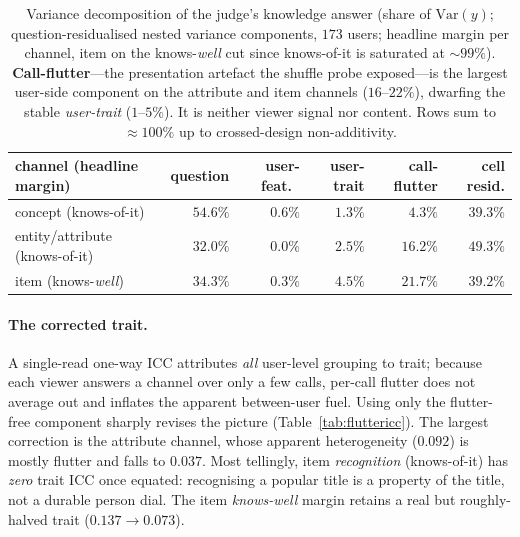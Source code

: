\documentclass[11pt]{article}
\begin{document}
\begin{table}[h]\centering\small
\begin{tabular}{lrrrrr}
\toprule
channel (headline margin) & question & user-feat.\ & user-trait & call-flutter & cell resid.\\
\midrule
concept (knows-of-it)          & $54.6\%$ & $0.6\%$ & $1.3\%$ & $4.3\%$  & $39.3\%$\\
entity/attribute (knows-of-it) & $32.0\%$ & $0.0\%$ & $2.5\%$ & $16.2\%$ & $49.3\%$\\
item (knows-\emph{well})       & $34.3\%$ & $0.3\%$ & $4.5\%$ & $21.7\%$ & $39.2\%$\\
\bottomrule
\end{tabular}
\caption{Variance decomposition of the judge's knowledge answer (share of $\mathrm{Var}(y)$; question-residualised
nested variance components, $173$ users; headline margin per channel, item on the knows-\emph{well} cut since
knows-of-it is saturated at ${\sim}99\%$). \textbf{Call-flutter}---the presentation artefact the shuffle probe
exposed---is the largest user-side component on the attribute and item channels ($16$--$22\%$), dwarfing the stable
\emph{user-trait} ($1$--$5\%$). It is neither viewer signal nor content. Rows sum to $\approx100\%$ up to
crossed-design non-additivity.}
\label{tab:flutterdecomp}
\end{table}

\paragraph{The corrected trait.} A single-read one-way ICC attributes \emph{all} user-level grouping to trait; because
each viewer answers a channel over only a few calls, per-call flutter does not average out and inflates the apparent
between-user fuel. Using only the flutter-free component sharply revises the picture (Table~\ref{tab:fluttericc}). The
largest correction is the attribute channel, whose apparent heterogeneity ($0.092$) is mostly flutter and falls to
$0.037$. Most tellingly, item \emph{recognition} (knows-of-it) has \emph{zero} trait ICC once equated: recognising a
popular title is a property of the title, not a durable person dial. The item \emph{knows-well} margin retains a real
but roughly-halved trait ($0.137\to0.073$).
\end{document}
